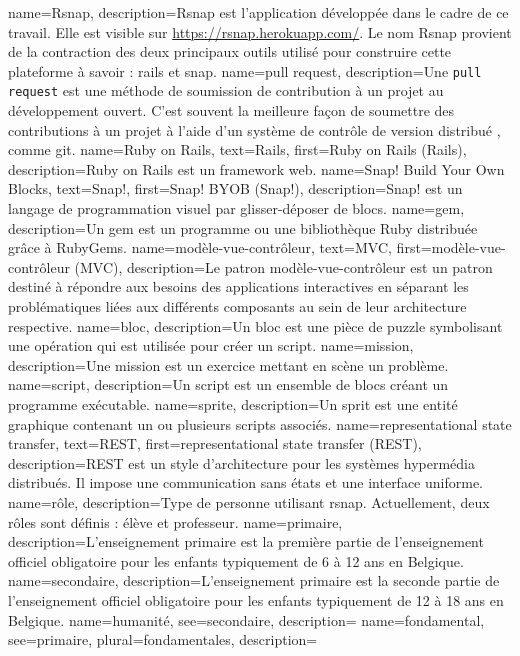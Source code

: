 

{
 name=Rsnap,
 description={Rsnap \cite{rsnap} est l'application développée dans le cadre de ce travail. Elle est visible sur \url{https://rsnap.herokuapp.com/}. Le nom Rsnap provient de la contraction des deux principaux outils utilisé pour construire cette plateforme à savoir : \gls{rails} et \gls{snap}.}
}
{
 name={pull request},
 description={Une \texttt{pull request} est une méthode de soumission de contribution à un projet au développement ouvert. C'est  souvent la meilleure façon de soumettre des contributions à un projet à l'aide d'un système de contrôle de version distribué , comme git.}
}
{
 name={Ruby on Rails},
 text={Rails},
 first={Ruby on Rails (Rails)},
 description={Ruby on Rails \cite{rails} est un framework web.}
}
{
 name={Snap! Build Your Own Blocks},
 text={Snap!},
 first={Snap! BYOB (Snap!)},
 description={Snap! \cite{snap} est un langage de programmation visuel par glisser-déposer de \glspl{bloc}.}
}
{
 name={gem},
 description={Un gem \cite{gem} est un programme ou une bibliothèque Ruby distribuée grâce à RubyGems.}
}
{
 name={modèle-vue-contrôleur},
 text={MVC},
 first={modèle-vue-contrôleur (MVC)},
 description={Le patron modèle-vue-contrôleur \cite{wiki-mvc} est un patron destiné à répondre aux besoins des applications interactives en séparant les problématiques liées aux différents composants au sein de leur architecture respective.}
}
{
 name={bloc},
 description={Un bloc est une pièce de puzzle symbolisant une opération qui est utilisée pour créer un \gls{script}.}
}
{
 name={mission},
 description={Une mission est un exercice mettant en scène un problème.}
}
{
 name={script},
 description={Un script est un ensemble de blocs créant un programme exécutable.}
}
{
 name={sprite},
 description={Un sprit est une entité graphique contenant un ou plusieurs scripts associés.}
}
{
 name={representational state transfer},
 text={REST},
 first={representational state transfer (REST)},
 description={REST est un style d’architecture pour les systèmes hypermédia distribués. Il impose une communication sans états et une interface uniforme.}
}
{
 name={rôle},
 description={Type de personne utilisant \gls{rsnap}. Actuellement, deux rôles sont définis : élève et professeur.}
}
{
 name={primaire},
 description={L'enseignement primaire est la première partie de l'enseignement officiel obligatoire pour les enfants typiquement de 6 à 12 ans en Belgique.}
}
{
 name={secondaire},
 description={L'enseignement primaire est la seconde partie de l'enseignement officiel obligatoire pour les enfants typiquement de 12 à 18 ans en Belgique.}
}
{
 name={humanité},
 see=secondaire,
 description={}
}
{
 name={fondamental},
 see=primaire,
 plural={fondamentales},
 description={}
}
